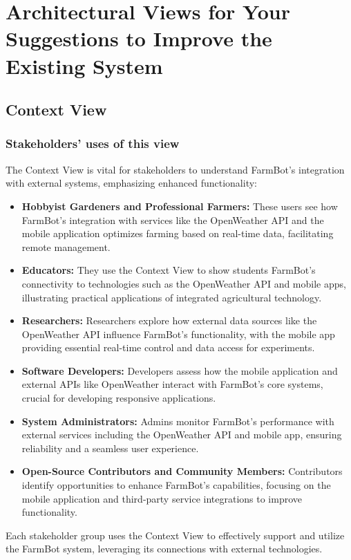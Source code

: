 \chapter{Architectural Views for Your Suggestions to Improve the Existing System} \label{suggest}


\section{Context View}

\subsection{Stakeholders’ uses of this view}
The Context View is vital for stakeholders to understand FarmBot’s integration with external systems, emphasizing enhanced functionality:
\begin{itemize}
    \item \textbf{Hobbyist Gardeners and Professional Farmers:} These users see how FarmBot’s integration with services like the OpenWeather API and the mobile application optimizes farming based on real-time data, facilitating remote management.
    \item \textbf{Educators:} They use the Context View to show students FarmBot’s connectivity to technologies such as the OpenWeather API and mobile apps, illustrating practical applications of integrated agricultural technology.
    \item \textbf{Researchers:} Researchers explore how external data sources like the OpenWeather API influence FarmBot’s functionality, with the mobile app providing essential real-time control and data access for experiments.
    \item \textbf{Software Developers:} Developers assess how the mobile application and external APIs like OpenWeather interact with FarmBot’s core systems, crucial for developing responsive applications.
    \item \textbf{System Administrators:} Admins monitor FarmBot’s performance with external services including the OpenWeather API and mobile app, ensuring reliability and a seamless user experience.
    \item \textbf{Open-Source Contributors and Community Members:} Contributors identify opportunities to enhance FarmBot’s capabilities, focusing on the mobile application and third-party service integrations to improve functionality.
\end{itemize}
Each stakeholder group uses the Context View to effectively support and utilize the FarmBot system, leveraging its connections with external technologies.

